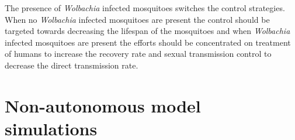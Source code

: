 \documentclass{ws-rv9x6}
\begin{document}
The presence of \textit{Wolbachia} infected mosquitoes switches the control strategies. When no \textit{Wolbachia} infected mosquitoes are present the control should be targeted towards decreasing the lifespan of the mosquitoes and when \textit{Wolbachia} infected mosquitoes are present the efforts should be concentrated on treatment of humans to increase the recovery rate and sexual transmission control to decrease the direct transmission rate.

\section{Non-autonomous model simulations}

\end{document}
